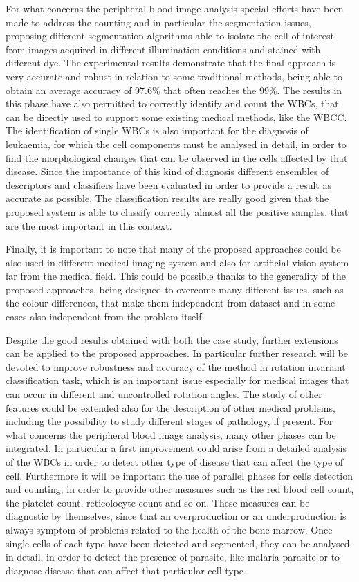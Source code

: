 \documentclass[final,a4paper,12pt,english]{UnicaPhdThesis3}
\begin{document}
	For what concerns the peripheral blood image analysis special efforts have been made to address the counting and in particular the segmentation issues, proposing different segmentation algorithms able to isolate the cell of interest from images acquired in different illumination conditions and stained with different dye. The experimental results demonstrate that the final approach is very accurate and robust in relation to some traditional methods, being able to obtain an average accuracy of 97.6\% that often reaches the 99\%. The results in this phase have also permitted  to correctly identify and count the WBCs, that can be directly used to support some existing medical methods, like the WBCC. The identification of single WBCs is also important for the diagnosis of leukaemia, for which the cell components must be analysed in detail, in order to find the morphological changes that can be observed in the cells affected by that disease. Since the importance of this kind of diagnosis different ensembles of descriptors and classifiers have been evaluated in order to provide a result as accurate as possible. The classification results are really good given that the proposed system is able to classify correctly almost all the positive samples, that are the most important in this context. 
	
	Finally, it is important to note that many of the proposed approaches could be also used in different medical imaging system and also for artificial vision system far from the medical field. This could be possible thanks to the generality of the proposed approaches, being designed to overcome many different issues, such as the colour differences, that make them independent from dataset and in some cases also independent from the problem itself.
	
	Despite the good results obtained with both the case study, further extensions can be applied to the proposed approaches. In particular further research will be devoted to improve robustness and accuracy of the method in rotation invariant classification task, which is an important issue especially for medical images that can occur in different and uncontrolled rotation angles. The study of other features could be extended also for the description of other medical problems, including the possibility to study different stages of pathology, if present. For what concerns the peripheral blood image analysis, many other phases can be integrated. In particular a first improvement could arise from a detailed analysis of the WBCs in order to detect other type of disease that can affect the type of cell. Furthermore it will be important the use of parallel phases for cells detection and counting, in order to provide other measures such as the red blood cell count, the platelet count, reticolocyte count and so on. These measures can be diagnostic by themselves, since that an overproduction or an underproduction is always symptom of problems related to the health of the bone marrow. Once single cells of each type have been detected and segmented, they can be analysed in detail, in order to detect the presence of parasite, like malaria parasite or to diagnose disease that can affect that particular cell type.    
	
\end{document}
